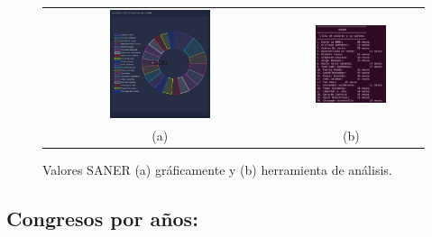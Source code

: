 \documentclass[a4paper, 12pt]{book}
\begin{document}
\begin{figure}[!h]
    \centering
    \begin{tabular}{cc}
    \includegraphics[width=0.45\textwidth]{img/saner_all_graph.png} &  
    \includegraphics[width=0.52\textwidth]{img/saner_all.png} \\ 
    (a) &(b) 
    \end{tabular}
    \caption{Valores SANER (a) gráficamente y (b) herramienta de análisis.}
    \label{fig:comp_saner_all}
\end{figure}

\subsection{Congresos por años:}
\end{document}
